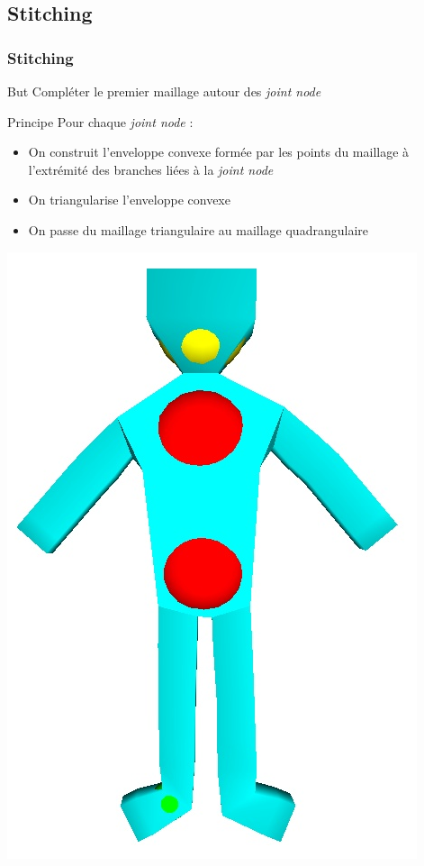 \documentclass[9pt]{beamer}
\begin{document}
\subsection{Stitching}
\begin{frame}
	\frametitle{Stitching}
	\begin{block}{But}
		Compléter le premier maillage autour des \textit{joint node}
	\end{block}
	\begin{block}{Principe}
		Pour chaque \textit{joint node} :
		\begin{itemize}
				\item On construit l'enveloppe convexe formée par les points du maillage à l'extrémité des branches liées à la \textit{joint node}
				\item On triangularise l'enveloppe convexe
				\item On passe du maillage triangulaire au maillage quadrangulaire
		\end{itemize}
	\end{block}
	\begin{center}
	\includegraphics[scale=0.15]{images/stitching.png}
	\end{center}
\end{frame}
\end{document}
